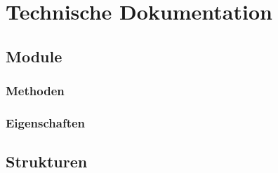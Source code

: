 \section{Technische Dokumentation}

    \subsection{Module}
        \subsubsection{Methoden}

        \subsubsection{Eigenschaften}

    \subsection{Strukturen}

